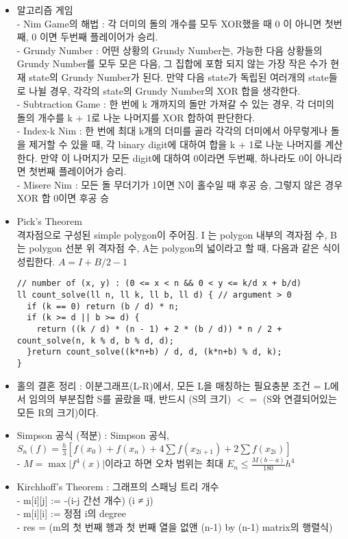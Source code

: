 \documentclass[landscape, 8pt, a4paper, oneside]{extarticle}
\begin{document}
\begin{multicols*}{3}
\begin{itemize}[noitemsep]
\item 알고리즘 게임\\
- Nim Game의 해법 : 각 더미의 돌의 개수를 모두 XOR했을 때 0 이 아니면 첫번째, 0 이면 두번째 플레이어가 승리.\\
- Grundy Number : 어떤 상황의 Grundy Number는, 가능한 다음 상황들의 Grundy Number를 모두 모은 다음, 그 집합에 포함 되지 않는 가장 작은 수가 현재 state의 Grundy Number가 된다. 만약 다음 state가 독립된 여러개의 state들로 나뉠 경우, 각각의 state의 Grundy Number의 XOR 합을 생각한다.\\
- Subtraction Game : 한 번에 k 개까지의 돌만 가져갈 수 있는 경우, 각 더미의 돌의 개수를 k + 1로 나눈 나머지를 XOR 합하여 판단한다.\\
- Index-k Nim : 한 번에 최대 k개의 더미를 골라 각각의 더미에서 아무렇게나 돌을 제거할 수 있을 때, 각 binary digit에 대하여 합을 k + 1로 나눈 나머지를 계산한다. 만약 이 나머지가 모든 digit에 대하여 0이라면 두번째, 하나라도 0이 아니라면 첫번째 플레이어가 승리.\\
- Misere Nim : 모든 돌 무더기가 1이면 N이 홀수일 때 후공 승, 그렇지 않은 경우 XOR 합 0이면 후공 승

\item Pick’s Theorem\\
격자점으로 구성된 simple polygon이 주어짐. I 는 polygon 내부의 격자점 수, B 는 polygon 선분 위 격자점 수, A는 polygon의 넓이라고 할 때, 다음과 같은 식이 성립한다. $A=I+B/2-1$
\begin{verbatim}
// number of (x, y) : (0 <= x < n && 0 < y <= k/d x + b/d)
ll count_solve(ll n, ll k, ll b, ll d) { // argument > 0
  if (k == 0) return (b / d) * n;
  if (k >= d || b >= d) {
    return ((k / d) * (n - 1) + 2 * (b / d)) * n / 2 + count_solve(n, k % d, b % d, d);
  }return count_solve((k*n+b) / d, d, (k*n+b) % d, k);
}
\end{verbatim}

\item 홀의 결혼 정리 : 이분그래프(L-R)에서, 모든 L을 매칭하는 필요충분 조건 = L에서 임의의 부분집합 S를 골랐을 때, 반드시 (S의 크기) $<=$ (S와 연결되어있는 모든 R의 크기)이다.

\item Simpson 공식 (적분) : Simpson 공식, $S_n(f) = \frac{h}{3}[f(x_0)+f(x_n)+ 4\sum f(x_{2i+1}) + 2\sum f(x_{2i})]$\\
- $M = \max \vert f^4(x) \vert$이라고 하면 오차 범위는 최대 $E_n \leq \frac{M(b-a)}{180}h^4$

\item Kirchhoff’s Theorem : 그래프의 스패닝 트리 개수\\
- m[i][j] :=  -(i-j 간선 개수) (i ≠ j)\\
- m[i][i] :=  정점 i의 degree\\
- res =  (m의 첫 번째 행과 첫 번째 열을 없앤 (n-1) by (n-1) matrix의 행렬식)


\end{itemize}
\end{multicols*}
\end{document}
